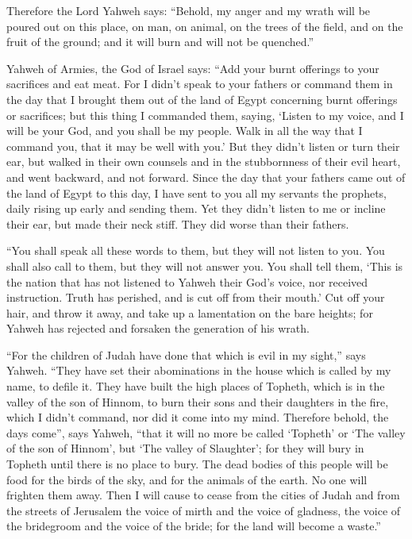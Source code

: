  Therefore the Lord Yahweh says: ``Behold, my anger and
my wrath will be poured out on this place, on man, on animal, on the
trees of the field, and on the fruit of the ground; and it will burn and
will not be quenched.''

 Yahweh of Armies, the God of Israel says: ``Add your
burnt offerings to your sacrifices and eat meat.  For I
didn't speak to your fathers or command them in the day that I brought
them out of the land of Egypt concerning burnt offerings or sacrifices;
 but this thing I commanded them, saying, `Listen to my
voice, and I will be your God, and you shall be my people. Walk in all
the way that I command you, that it may be well with you.'
 But they didn't listen or turn their ear, but walked in
their own counsels and in the stubbornness of their evil heart, and went
backward, and not forward.  Since the day that your
fathers came out of the land of Egypt to this day, I have sent to you
all my servants the prophets, daily rising up early and sending them.
 Yet they didn't listen to me or incline their ear, but
made their neck stiff. They did worse than their fathers.

 ``You shall speak all these words to them, but they will
not listen to you. You shall also call to them, but they will not answer
you.  You shall tell them, `This is the nation that has
not listened to Yahweh their God's voice, nor received instruction.
Truth has perished, and is cut off from their mouth.' 
Cut off your hair, and throw it away, and take up a lamentation on the
bare heights; for Yahweh has rejected and forsaken the generation of his
wrath.

 ``For the children of Judah have done that which is evil
in my sight,'' says Yahweh. ``They have set their abominations in the
house which is called by my name, to defile it.  They
have built the high places of Topheth, which is in the valley of the son
of Hinnom, to burn their sons and their daughters in the fire, which I
didn't command, nor did it come into my mind.  Therefore
behold, the days come'', says Yahweh, ``that it will no more be called
`Topheth' or `The valley of the son of Hinnom', but `The valley of
Slaughter'; for they will bury in Topheth until there is no place to
bury.  The dead bodies of this people will be food for
the birds of the sky, and for the animals of the earth. No one will
frighten them away.  Then I will cause to cease from the
cities of Judah and from the streets of Jerusalem the voice of mirth and
the voice of gladness, the voice of the bridegroom and the voice of the
bride; for the land will become a waste.''

